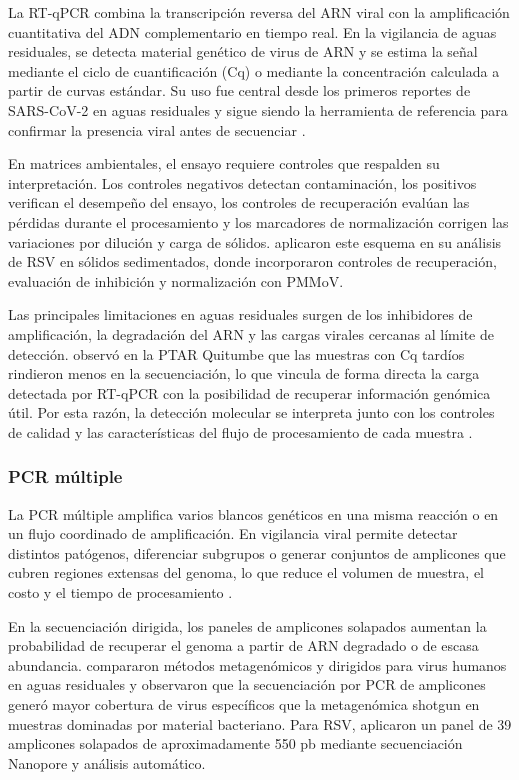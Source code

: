 La RT-qPCR combina la transcripción reversa del ARN viral con la amplificación cuantitativa del ADN complementario en tiempo real. En la vigilancia de aguas residuales, se detecta material genético de virus de ARN y se estima la señal mediante el ciclo de cuantificación (Cq) o mediante la concentración calculada a partir de curvas estándar. Su uso fue central desde los primeros reportes de SARS-CoV-2 en aguas residuales y sigue siendo la herramienta de referencia para confirmar la presencia viral antes de secuenciar \cite{Ahmed_2020,Medema_2020}.

En matrices ambientales, el ensayo requiere controles que respalden su interpretación. Los controles negativos detectan contaminación, los positivos verifican el desempeño del ensayo, los controles de recuperación evalúan las pérdidas durante el procesamiento y los marcadores de normalización corrigen las variaciones por dilución y carga de sólidos.  aplicaron este esquema en su análisis de RSV en sólidos sedimentados, donde incorporaron controles de recuperación, evaluación de inhibición y normalización con PMMoV.

Las principales limitaciones en aguas residuales surgen de los inhibidores de amplificación, la degradación del ARN y las cargas virales cercanas al límite de detección.  observó en la PTAR Quitumbe que las muestras con Cq tardíos rindieron menos en la secuenciación, lo que vincula de forma directa la carga detectada por RT-qPCR con la posibilidad de recuperar información genómica útil. Por esta razón, la detección molecular se interpreta junto con los controles de calidad y las características del flujo de procesamiento de cada muestra \cite{Parkins_2023}.

\subsubsection{PCR múltiple}

La PCR múltiple amplifica varios blancos genéticos en una misma reacción o en un flujo coordinado de amplificación. En vigilancia viral permite detectar distintos patógenos, diferenciar subgrupos o generar conjuntos de amplicones que cubren regiones extensas del genoma, lo que reduce el volumen de muestra, el costo y el tiempo de procesamiento \cite{Le_2025}.

En la secuenciación dirigida, los paneles de amplicones solapados aumentan la probabilidad de recuperar el genoma a partir de ARN degradado o de escasa abundancia.  compararon métodos metagenómicos y dirigidos para virus humanos en aguas residuales y observaron que la secuenciación por PCR de amplicones generó mayor cobertura de virus específicos que la metagenómica shotgun en muestras dominadas por material bacteriano. Para RSV,  aplicaron un panel de 39 amplicones solapados de aproximadamente 550 pb mediante secuenciación Nanopore y análisis automático.

